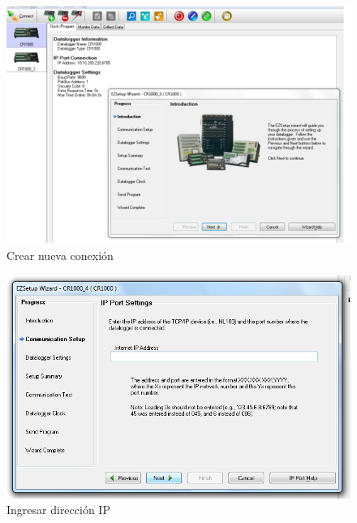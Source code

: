 \begin{figure}[h!]
        \centering
        \includegraphics[width=320pt]{images/pruebas1}
        \caption{Crear nueva conexión}
        \label{ether1}
\end{figure}
\begin{figure}[h!]
        \centering
        \includegraphics[width=400pt]{images/pruebas2}
        \caption{Ingresar dirección IP}
        \label{ether2}
\end{figure}

